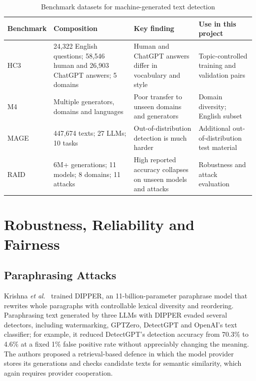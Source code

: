 \begin{table}[H]
\caption{Benchmark datasets for machine-generated text detection}
\label{tab:lit-bench}
\centering
\small
\begin{tabularx}{\textwidth}{|p{2.0cm}|L|L|L|}
\hline
\textbf{Benchmark} & \textbf{Composition} & \textbf{Key finding} & \textbf{Use in this project} \\ \hline
HC3~\cite{guo2023hc3} & 24,322 English questions; 58,546 human and 26,903 ChatGPT answers; 5 domains & Human and ChatGPT answers differ in vocabulary and style & Topic-controlled training and validation pairs \\ \hline
M4~\cite{wang2024m4} & Multiple generators, domains and languages & Poor transfer to unseen domains and generators & Domain diversity; English subset \\ \hline
MAGE~\cite{li2024mage} & 447,674 texts; 27 LLMs; 10 tasks & Out-of-distribution detection is much harder & Additional out-of-distribution test material \\ \hline
RAID~\cite{dugan2024raid} & 6M+ generations; 11 models; 8 domains; 11 attacks & High reported accuracy collapses on unseen models and attacks & Robustness and attack evaluation \\ \hline
\end{tabularx}
\end{table}

\section{Robustness, Reliability and Fairness}
\label{sec:lit-fairness}

\subsection{Paraphrasing Attacks}

Krishna \textit{et al.}~\cite{krishna2023paraphrasing} trained DIPPER, an
11-billion-parameter paraphrase model that rewrites whole paragraphs with
controllable lexical diversity and reordering. Paraphrasing text generated by
three LLMs with DIPPER evaded several detectors, including watermarking,
GPTZero, DetectGPT and OpenAI's text classifier; for example, it reduced
DetectGPT's detection accuracy from 70.3\% to 4.6\% at a fixed 1\% false
positive rate without appreciably changing the meaning. The authors proposed a
retrieval-based defence in which the model provider stores its generations and
checks candidate texts for semantic similarity, which again requires provider
cooperation.

